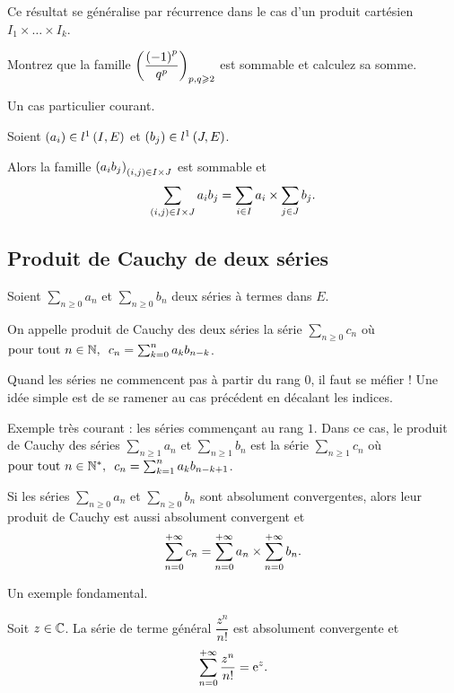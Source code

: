 Ce résultat se généralise par récurrence dans le cas d'un produit cartésien \(I_1\times\dots\times I_k\).

\begin{exo}
Montrez que la famille \(\left(\dfrac{\left(-1\right)^p}{q^p}\right)_{p,q\geqslant2}\) est sommable et calculez sa somme.
\end{exo}

Un cas particulier courant.

\begin{prop}
Soient \(\left(a_i\right)\in l^1\left(I,E\right)\) et \(\left(b_j\right)\in l^1\left(J,E\right)\).

Alors la famille \(\left(a_ib_j\right)_{\left(i,j\right)\in I\times J}\) est sommable et \[\sum_{\left(i,j\right)\in I\times J}a_ib_j=\sum_{i\in I}a_i\times\sum_{j\in J}b_j.\]
\end{prop}

\subsection{Produit de Cauchy de deux séries}

\begin{defi}
Soient \(\sum_{n\geq0}a_n\) et \(\sum_{n\geq0}b_n\) deux séries à termes dans \(E\).

On appelle produit de Cauchy des deux séries la série \(\sum_{n\geq0}c_n\) où \(\quantifs{\tpt n\in\N}c_n=\sum_{k=0}^na_kb_{n-k}\).
\end{defi}

\begin{rem}
Quand les séries ne commencent pas à partir du rang \(0\), il faut se méfier ! Une idée simple est de se ramener au cas précédent en décalant les indices.

Exemple très courant : les séries commençant au rang \(1\). Dans ce cas, le produit de Cauchy des séries \(\sum_{n\geq1}a_n\) et \(\sum_{n\geq1}b_n\) est la série \(\sum_{n\geq1}c_n\) où \(\quantifs{\tpt n\in\Ns}c_n=\sum_{k=1}^na_kb_{n-k+1}\).
\end{rem}

\begin{theo}
Si les séries \(\sum_{n\geq0}a_n\) et \(\sum_{n\geq0}b_n\) sont absolument convergentes, alors leur produit de Cauchy est aussi absolument convergent et \[\sum_{n=0}^{+\infty}c_n=\sum_{n=0}^{+\infty}a_n\times\sum_{n=0}^{+\infty}b_n.\]
\end{theo}

Un exemple fondamental.

\begin{prop}
Soit \(z\in\mathbb{C}\). La série de terme général \(\dfrac{z^n}{n!}\) est absolument convergente et \[\sum_{n=0}^{+\infty}\dfrac{z^n}{n!}=\mathrm{e}^{z}.\]
\end{prop}

